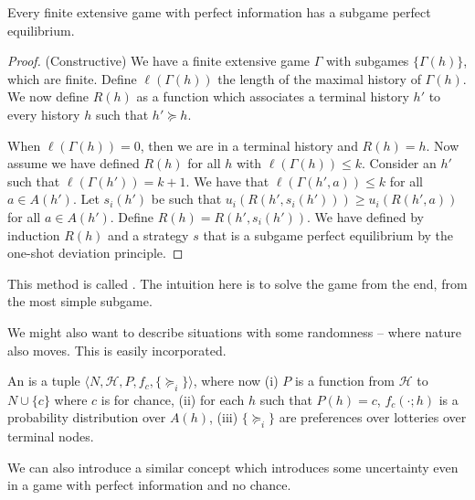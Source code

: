 \documentclass[10pt]{article}
\begin{document}
\begin{theorem}
	 Every finite extensive game with perfect information has a subgame perfect equilibrium.
\end{theorem}
\begin{proof}
	(Constructive) We have a finite extensive game $\Gamma$ with subgames $\{\Gamma(h)\}$, which are finite. Define $\ell(\Gamma(h))$ the length of the maximal history of $\Gamma(h)$. We now define $R(h)$ as a function which associates a terminal history $h'$ to every history $h$ such that $h' \succeq h$. 
	
	When $\ell(\Gamma(h)) = 0$, then we are in a terminal history and $R(h) = h$. Now assume we have defined $R(h)$ for all $h$ with $\ell(\Gamma(h)) \le k$. Consider an $h'$ such that $\ell(\Gamma(h')) = k+1$. We have that $\ell(\Gamma(h',a)) \le k$ for all $a \in A(h')$. Let $s_i(h')$ be such that $u_i(R(h',s_i(h'))) \ge u_i(R(h',a))$ for all $a \in A(h')$. Define $R(h) = R(h',s_i(h'))$. We have defined by induction $R(h)$ and a strategy $s$ that is a subgame perfect equilibrium by the one-shot deviation principle.
\end{proof}

\begin{remark}
	This method is called . The intuition here is to solve the game from the end, from the most simple subgame.
\end{remark}

\begin{remark}
	We might also want to describe situations with some randomness -- where nature also moves. This is easily incorporated.
\end{remark}

\begin{definition}
	An  is a tuple $\langle N,\mathcal{H},P,f_c,\{\succeq_i\}\rangle$, where now (i) $P$ is a function from $\mathcal{H}$ to $N \cup \{c\}$ where $c$ is for chance, (ii) for each $h$ such that $P(h) = c$, $f_c(\cdot; h)$ is a probability distribution over $A(h)$, (iii) $\{\succeq_i\}$ are preferences over lotteries over terminal nodes. 
\end{definition}

\begin{remark}
	We can also introduce a similar concept which introduces some uncertainty even in a game with perfect information and no chance.
\end{remark}
\end{document}
